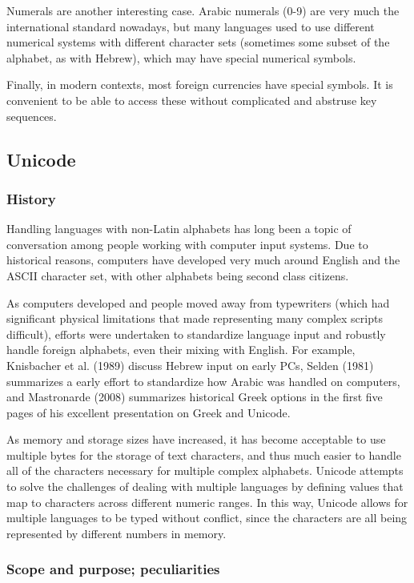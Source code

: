 \documentclass[11pt]{article}
\begin{document}
Numerals are another interesting case. Arabic numerals (0-9) are very much the international standard nowadays, but many languages used to use different numerical systems with different character sets (sometimes some subset of the alphabet, as with Hebrew), which may have special numerical symbols.

Finally, in modern contexts, most foreign currencies have special symbols. It is convenient to be able to access these without complicated and abstruse key sequences.

\subsection{Unicode}
\label{sec:orga7bd195}

\subsubsection{History}
\label{sec:orga014bd2}

Handling languages with non-Latin alphabets has long been a topic of conversation among people working with computer input systems. Due to historical reasons, computers have developed very much around English and the ASCII character set, with other alphabets being second class citizens.

As computers developed and people moved away from typewriters (which had significant physical limitations that made representing many complex scripts difficult), efforts were undertaken to standardize language input and robustly handle foreign alphabets, even their mixing with English. For example, Knisbacher et al. (1989) discuss Hebrew input on early PCs, Selden (1981) summarizes a early effort to standardize how Arabic was handled on computers, and Mastronarde (2008) summarizes historical Greek options in the first five pages of his excellent presentation on Greek and Unicode.

As memory and storage sizes have increased, it has become acceptable to use multiple bytes for the storage of text characters, and thus much easier to handle all of the characters necessary for multiple complex alphabets. Unicode attempts to solve the challenges of dealing with multiple languages by defining values that map to characters across different numeric ranges. In this way, Unicode allows for multiple languages to be typed without conflict, since the characters are all being represented by different numbers in memory.

\subsubsection{Scope and purpose; peculiarities}
\label{sec:org27acc40}
\end{document}

